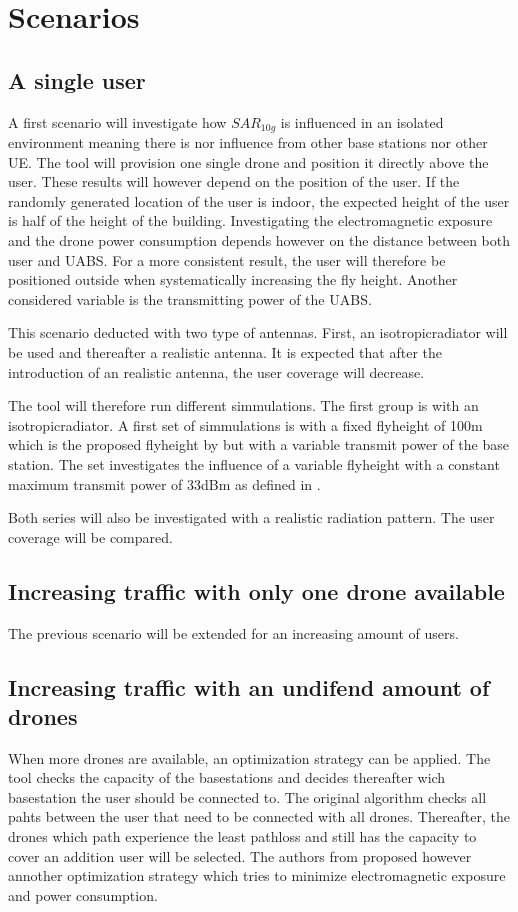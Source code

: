 \chapter{Scenarios}
\label{chap:scenarios}

\section{A single user}

A first scenario will investigate how $SAR_{10g}$ is influenced in an isolated environment meaning there is nor influence 
from other base stations nor other \gls{UE}. The tool will provision one single drone and position it directly above the user.
These results will however depend on the position of the user. If the randomly generated location of the user is indoor, the expected height
of the user is half of the height of the building. Investigating the electromagnetic exposure and the drone power consumption depends however on the
distance between both user and \gls{UABS}. For a more consistent result, the user will therefore be positioned outside when systematically 
increasing the fly height. Another considered variable is the transmitting power of the \gls{UABS}.

This scenario deducted with two type of antennas. First, an \gls{isotropicradiator} will be used and thereafter a realistic antenna.
It is expected that after the introduction of an realistic antenna, the user coverage will decrease.

The tool will therefore run different simmulations. The first group is with an \gls{isotropicradiator}. A first set of simmulations
is with a fixed flyheight of 100m which is the proposed flyheight by \cite{J2} but with a variable transmit power of the base station.
The set investigates the influence of a variable flyheight with a constant maximum transmit power of 33dBm as defined in \cite{J2}.

Both series will also be investigated with a realistic radiation pattern. The user coverage will be compared. 



\section{Increasing traffic with only one drone available}
The previous scenario will be extended for an increasing amount of users. 


\section{Increasing traffic with an undifend amount of drones}
When more drones are available, an optimization strategy can be applied. The tool checks the capacity of the basestations and decides thereafter
wich basestation the user should be connected to. The original algorithm checks all pahts between the user that need to be connected with 
all drones. Thereafter, the drones which path experience the least pathloss and still has the capacity to cover an addition user will be selected.
The authors from \cite{J1} proposed however annother optimization strategy which tries to minimize electromagnetic exposure and 
power consumption.

